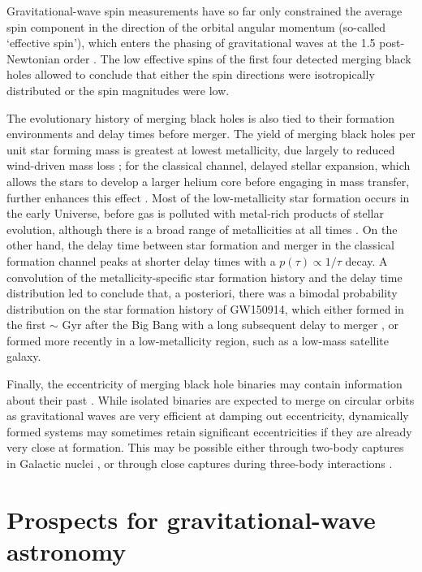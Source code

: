 \documentclass[iop,onecolumn]{revtex4}
\begin{document}
Gravitational-wave spin measurements have so far only constrained the average spin component in the direction of the orbital angular momentum (so-called `effective spin'), which enters the phasing of gravitational waves at the 1.5 post-Newtonian order \citep{PoissonWill}.  The low effective spins of the first four detected merging black holes allowed \citet{Farr:2017} to conclude that either the spin directions were isotropically distributed or the spin magnitudes were low.

The evolutionary history of merging black holes is also tied to their formation environments and delay times before merger.  
The yield of merging black holes per unit star forming mass is greatest at lowest metallicity, due largely to reduced wind-driven mass loss \citep[e.g.,][]{Belczynski:2010}; for the classical channel, delayed stellar expansion, which allows the stars to develop a larger helium core before engaging in mass transfer, further enhances this effect \citep[e.g.,][]{Stevenson:2017}.  Most of the low-metallicity star formation occurs in the early Universe, before gas is polluted with metal-rich products of stellar evolution, although there is a broad range of metallicities at all times \citep[e.g.,][]{NormanLanger:2005,TaylorKobayashi:2015}.  On the other hand, the delay time between star formation and merger in the classical formation channel peaks at shorter delay times with a $p(\tau) \propto 1/\tau$ decay.  A convolution of the metallicity-specific star formation history and the delay time distribution led \citet{Belczynski:2016} to conclude that, a posteriori, there was a bimodal probability distribution on the star formation history of GW150914, which either formed in the first $\sim$ Gyr after the Big Bang with a long subsequent delay to merger \citep{Dominik:2015}, or formed more recently in a low-metallicity region, such as a low-mass satellite galaxy.  

Finally, the eccentricity of merging black hole binaries may contain information about their past \citep{MandelOShaughnessy:2010}.  While isolated binaries are expected to merge on circular orbits as gravitational waves are very efficient at damping out eccentricity, dynamically formed systems may sometimes retain significant eccentricities if they are already very close at formation.  This may be possible either through two-body captures in Galactic nuclei \citep{OLeary:2008} \citet[but see][]{Tsang:2013}, or through close captures during three-body interactions \citep{Samsing:2013}.

\section{Prospects for gravitational-wave astronomy}\label{prospect}
\end{document}
